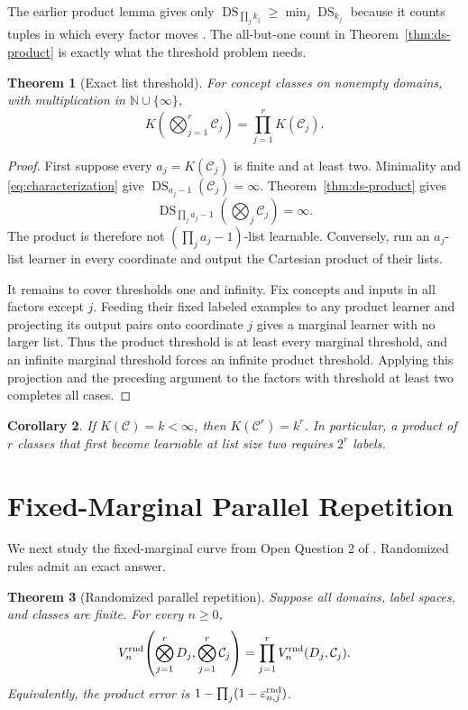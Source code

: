 \documentclass[twoside]{article}
\newtheorem{theorem}{Theorem}
\newtheorem{corollary}[theorem]{Corollary}
\newcommand{\DS}{\operatorname{DS}}
\newcommand{\cC}{\mathcal C}
\begin{document}
The earlier product lemma gives only $\DS_{\prod_jk_j}\geq\min_j\DS_{k_j}$ because it counts tuples in which every factor moves \citep[Proposition 40]{hanneke2024list}. The all-but-one count in Theorem~\ref{thm:ds-product} is exactly what the threshold problem needs.

\begin{theorem}[Exact list threshold]\label{thm:list-threshold}
For concept classes on nonempty domains, with multiplication in $\mathbb N\cup\{\infty\}$, \[ K\!\left(\bigotimes_{j=1}^r\cC_j\right)=\prod_{j=1}^rK(\cC_j). \]
\end{theorem}

\begin{proof}
First suppose every $a_j=K(\cC_j)$ is finite and at least two. Minimality and \eqref{eq:characterization} give $\DS_{a_j-1}(\cC_j)=\infty$. Theorem~\ref{thm:ds-product} gives \[ \DS_{\prod_ja_j-1}\!\left(\bigotimes_j\cC_j\right)=\infty. \] The product is therefore not $(\prod_ja_j-1)$-list learnable. Conversely, run an $a_j$-list learner in every coordinate and output the Cartesian product of their lists.

It remains to cover thresholds one and infinity. Fix concepts and inputs in all factors except $j$. Feeding their fixed labeled examples to any product learner and projecting its output pairs onto coordinate $j$ gives a marginal learner with no larger list. Thus the product threshold is at least every marginal threshold, and an infinite marginal threshold forces an infinite product threshold. Applying this projection and the preceding argument to the factors with threshold at least two completes all cases.
\end{proof}

\begin{corollary}
If $K(\cC)=k<\infty$, then $K(\cC^r)=k^r$. In particular, a product of $r$ classes that first become learnable at list size two requires $2^r$ labels.
\end{corollary}

\section{Fixed-Marginal Parallel Repetition}

We next study the fixed-marginal curve from Open Question 2 of \citet{hanneke2024list}. Randomized rules admit an exact answer.

\begin{theorem}[Randomized parallel repetition]\label{thm:random-product}
Suppose all domains, label spaces, and classes are finite. For every $n\geq0$, \[ V_n^{\rm rnd}\!\left(\bigotimes_{j=1}^rD_j,\bigotimes_{j=1}^r\cC_j\right)=\prod_{j=1}^rV_n^{\rm rnd}(D_j,\cC_j). \] Equivalently, the product error is $1-\prod_j(1-\varepsilon_{n,j}^{\rm rnd})$.
\end{theorem}
\end{document}
